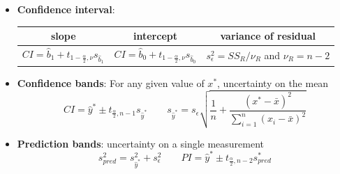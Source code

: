 \documentclass{article}
\begin{document}
\begin{itemize}
    \item \textbf{Confidence interval}:
     \begin{table}[H] \centering
    \begin{tabular}{c|c|c}

   slope & intercept & variance of residual \\ \hline
   $CI=\hat{b}_{1} + t_{1-\frac{\alpha}{2}, \nu}s_{\hat{b}_{1}}$ & $CI=\hat{b}_{0} + t_{1-\frac{\alpha}{2}, \nu}s_{\hat{b}_{0}}$ &
   $s_{\epsilon}^{2}= SS_{R}/\nu_{R}$ and $\nu_{R}=n-2$
    \end{tabular}\end{table}
    
    \item \textbf{Confidence bands}: For any given value of $x^*$, uncertainty on the mean
    \[CI = \hat{y}^{*}\pm t_{\frac{\alpha}{2}, n-1}s_{\hat{y}^{*}} \quad \quad s_{\hat{y}^{*}} = s_{\epsilon}\sqrt{\frac{1}{n}+\frac{(x^{*}-\bar{x})^{2}}{\sum_{i=1}^{n}(x_{i}-\bar{x})^{2}}}\]
    
    \item \textbf{Prediction bands}: uncertainty on a single measurement
    \[s_{pred}^{2} = s_{\hat{y}^{*}}^{2} + s_{\epsilon}^{2} \quad \quad PI=\hat{y}^{*}\pm t_{\frac{\alpha}{2}, n-2} s^{*}_{pred}\]
\end{itemize}
 
 

\vspace*{\fill}



\end{document}
